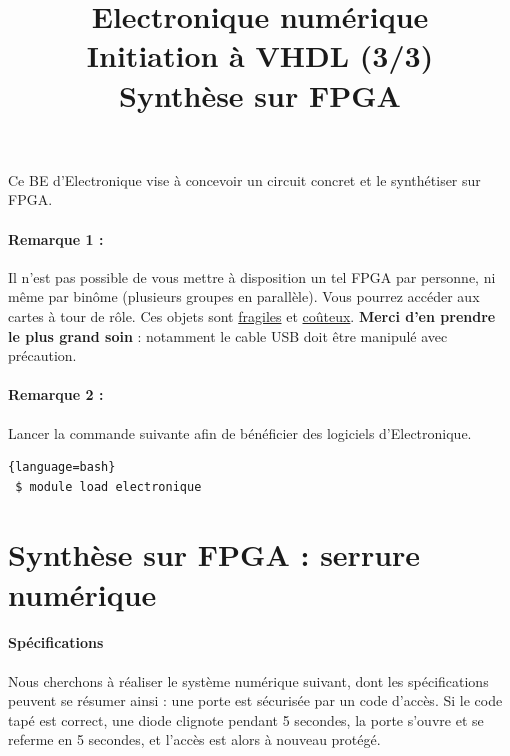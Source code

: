 \documentclass[a4paper,11pt]{article}
\title{{\Huge Electronique numérique}\\Initiation à VHDL (3/3)\\Synthèse sur FPGA}
\date{}
\begin{document}
\maketitle


Ce BE d'Electronique vise à concevoir un circuit concret et le synthétiser sur FPGA.

\paragraph{Remarque 1 :} Il n'est pas possible de vous mettre à disposition un tel FPGA par personne, ni même
par binôme (plusieurs groupes en parallèle). Vous pourrez accéder aux cartes à tour de rôle. Ces objets
sont \underline{fragiles} et \underline{coûteux}. \textbf{Merci d'en prendre le plus grand soin} : notamment le cable
USB doit être manipulé avec précaution.

\paragraph{Remarque 2 :} Lancer la commande suivante afin de bénéficier des logiciels d'Electronique.
\begin{lstlisting}{language=bash}
 $ module load electronique
\end{lstlisting}


\section{Synthèse sur FPGA : serrure numérique}
\paragraph{Spécifications}
Nous cherchons à réaliser le système numérique suivant, dont les spécifications peuvent se résumer ainsi :
une porte est sécurisée par un code d'accès. Si le code tapé est correct,
une diode clignote pendant 5 secondes, la porte s'ouvre et se referme en 5 secondes, et l'accès est alors à nouveau protégé.\\
\end{document}

